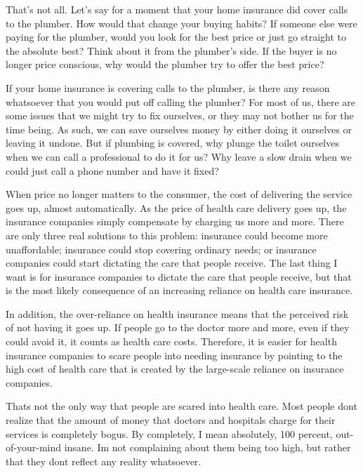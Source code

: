 \documentclass[letterpaper]{article}
\begin{document}
{\color{black}
That’s not all. Let’s say for a moment that your home insurance did
cover calls to the plumber. How would that change your buying habits? 
If someone else were paying for the plumber, would you look for the
best price or just go straight to the absolute best?  Think about it
from the plumber’s side. If the buyer is no longer price conscious, why
would the plumber try to offer the best price? }

{\color{black}
If your home insurance is covering calls to the plumber, is there any
reason \textcolor[rgb]{0.32941177,0.5529412,0.83137256}{whatsoever
}that you would put off calling the plumber?  For most of us, there are
some issues that we might try to fix ourselves, or they may not bother
us for the time being. As such, we can save ourselves money by either
doing it ourselves or leaving it undone.
\textcolor[rgb]{0.32941177,0.5529412,0.83137256}{But if plumbing is
covered, w}hy plunge the toilet ourselves when we can call a
professional to do it for us?  Why leave a slow drain when we could
just call a phone number and have it fixed? }

{\color{black}
When price no longer matters to the consumer, the cost of delivering the
service goes up, almost automatically. As the price of health care
delivery goes up, the insurance companies simply compensate by charging
us more and more. There are only three real solutions to this problem:
insurance could become more unaffordable; insurance could stop covering
ordinary needs; or insurance companies could start dictating the care
that people receive. The last thing I want is for insurance companies
to dictate the care that people receive, but that is the most likely
consequence of an increasing reliance on health care insurance.}

{\color{black}
In addition, the over-reliance on health insurance means that the
perceived risk of not having it goes up. If people go to the doctor
more and more, even if they could avoid it, it counts as health care
costs. Therefore, it is easier for health insurance companies to scare
people into needing insurance by pointing to the high cost of health
care that is created by the large-scale reliance on insurance
companies. }

{\color{black}
That{\textquotesingle}s not the only way that people are scared into
health care. Most people don{\textquotesingle}t realize that the amount
of money that doctors and hospitals charge for their services is
completely bogus. By completely, I mean absolutely, 100 percent,
out-of-your-mind insane. I{\textquotesingle}m not complaining about
them being too high, but rather that they don{\textquotesingle}t
reflect any reality whatsoever. }
\end{document}
